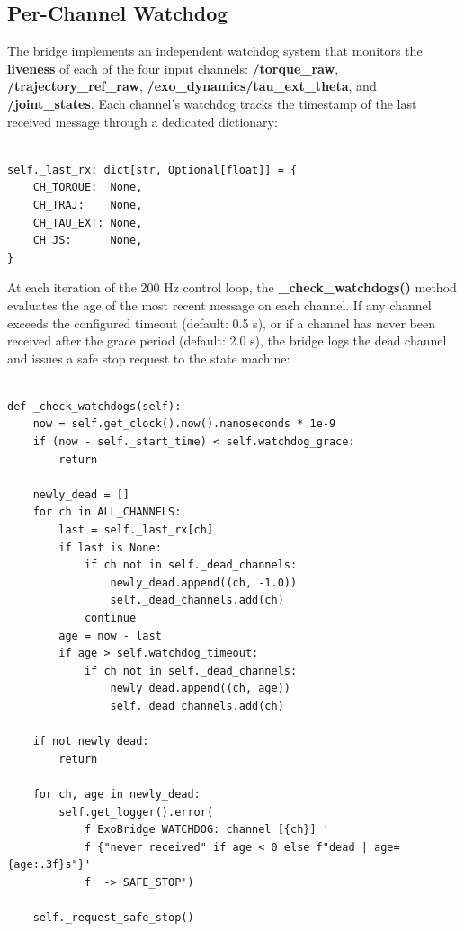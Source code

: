 \subsection{Per-Channel Watchdog}
The bridge implements an independent watchdog system that monitors the \textbf{liveness} of each of the four input channels: \textbf{/torque\_raw}, \textbf{/trajectory\_ref\_raw}, \textbf{/exo\_dynamics/tau\_ext\_theta}, and \textbf{/joint\_states}. Each channel's watchdog tracks the timestamp of the last received message through a dedicated dictionary:

\begin{verbatim}

self._last_rx: dict[str, Optional[float]] = {
    CH_TORQUE:  None,
    CH_TRAJ:    None,
    CH_TAU_EXT: None,
    CH_JS:      None,
}

\end{verbatim}

At each iteration of the 200 Hz control loop, the \textbf{\_check\_watchdogs()} method evaluates the age of the most recent message on each channel. If any channel exceeds the configured timeout (default: 0.5 s), or if a channel has never been received after the grace period (default: 2.0 s), the bridge logs the dead channel and issues a safe stop request to the state machine:

\begin{verbatim}

def _check_watchdogs(self):
    now = self.get_clock().now().nanoseconds * 1e-9
    if (now - self._start_time) < self.watchdog_grace:
        return

    newly_dead = []
    for ch in ALL_CHANNELS:
        last = self._last_rx[ch]
        if last is None:
            if ch not in self._dead_channels:
                newly_dead.append((ch, -1.0))
                self._dead_channels.add(ch)
            continue
        age = now - last
        if age > self.watchdog_timeout:
            if ch not in self._dead_channels:
                newly_dead.append((ch, age))
                self._dead_channels.add(ch)

    if not newly_dead:
        return

    for ch, age in newly_dead:
        self.get_logger().error(
            f'ExoBridge WATCHDOG: channel [{ch}] '
            f'{"never received" if age < 0 else f"dead | age={age:.3f}s"}'
            f' -> SAFE_STOP')

    self._request_safe_stop()

\end{verbatim}

